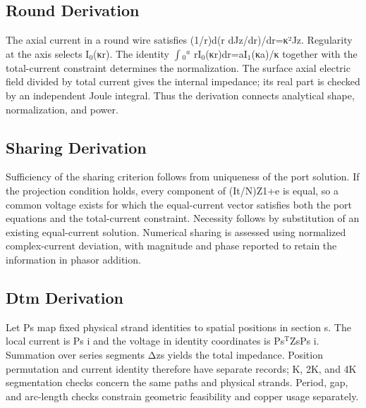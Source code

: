 \documentclass[11pt]{article}
\begin{document}
\subsection*{Round Derivation}
\hypertarget{S1.round_derivation.heading}{}
The axial current in a round wire satisfies (1/r)d(r dJz/dr)/dr=κ²Jz. Regularity at the axis selects I\(_0\)(κr). The identity \(\int\)\(_0\)\(^a\) rI\(_0\)(κr)dr=aI\(_1\)(κa)/κ together with the total-current constraint determines the normalization. The surface axial electric field divided by total current gives the internal impedance; its real part is checked by an independent Joule integral. Thus the derivation connects analytical shape, normalization, and power.


\subsection*{Sharing Derivation}
\hypertarget{S1.sharing_derivation.heading}{}
Sufficiency of the sharing criterion follows from uniqueness of the port solution. If the projection condition holds, every component of (It/N)Z1+e is equal, so a common voltage exists for which the equal-current vector satisfies both the port equations and the total-current constraint. Necessity follows by substitution of an existing equal-current solution. Numerical sharing is assessed using normalized complex-current deviation, with magnitude and phase reported to retain the information in phasor addition.


\subsection*{Dtm Derivation}
\hypertarget{S1.dtm_derivation.heading}{}
Let Ps map fixed physical strand identities to spatial positions in section s. The local current is Ps i and the voltage in identity coordinates is Ps\(^{\mathrm T}\)ZsPs i. Summation over series segments Δzs yields the total impedance. Position permutation and current identity therefore have separate records; K, 2K, and 4K segmentation checks concern the same paths and physical strands. Period, gap, and arc-length checks constrain geometric feasibility and copper usage separately.
\end{document}
